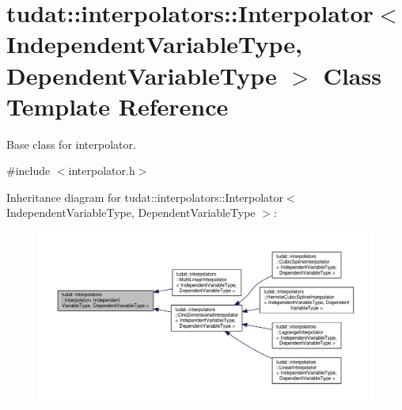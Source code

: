 \hypertarget{classtudat_1_1interpolators_1_1Interpolator}{}\section{tudat\+:\+:interpolators\+:\+:Interpolator$<$ Independent\+Variable\+Type, Dependent\+Variable\+Type $>$ Class Template Reference}
\label{classtudat_1_1interpolators_1_1Interpolator}


Base class for interpolator.  




{\ttfamily \#include $<$interpolator.\+h$>$}



Inheritance diagram for tudat\+:\+:interpolators\+:\+:Interpolator$<$ Independent\+Variable\+Type, Dependent\+Variable\+Type $>$\+:
\nopagebreak
\begin{figure}[H]
\begin{center}
\leavevmode
\includegraphics[width=350pt]{classtudat_1_1interpolators_1_1Interpolator__inherit__graph}
\end{center}
\end{figure}
